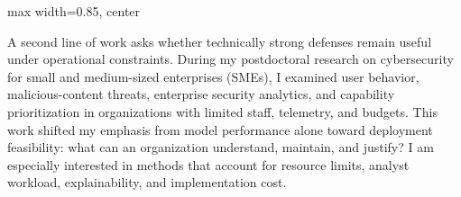 \documentclass[10pt]{article}
\newcommand{\interesthead}[2]{%
  \vspace{0.12em}\noindent{\large\bfseries\color{#1}#2}\par\vspace{0.05em}%
}
\begin{document}
\begin{adjustbox}{max width=0.85\linewidth, center}
\end{adjustbox}
\par\vspace{0.5em}

\vspace{-0.18em}
A second line of work asks whether technically strong defenses remain useful under operational constraints. During my postdoctoral research on cybersecurity for small and medium-sized enterprises (SMEs), I examined user behavior, malicious-content threats, enterprise security analytics, and capability prioritization in organizations with limited staff, telemetry, and budgets. This work shifted my emphasis from model performance alone toward deployment feasibility: what can an organization understand, maintain, and justify? I am especially interested in methods that account for resource limits, analyst workload, explainability, and implementation cost.


\newpage
\interesthead{ink}{AI-Enabled Cyber Defense}
\end{document}
